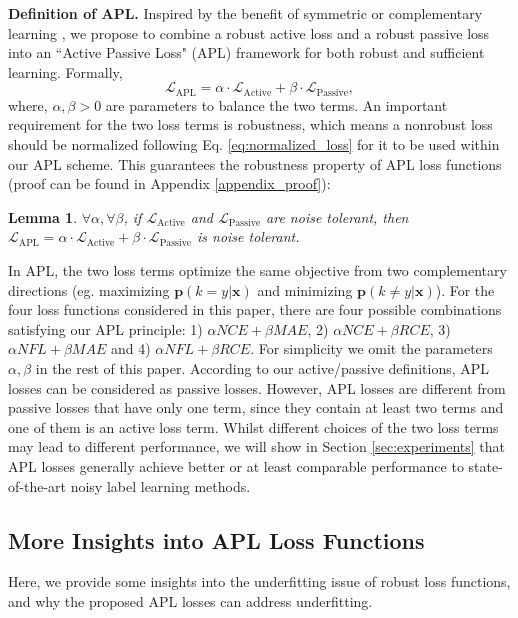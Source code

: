 \documentclass{article}
\newtheorem{lemma}{Lemma}
\def \xx {{\bm{x}}}
\def \pp {{\bm{p}}}
\def \L  {\mathcal{L}}
\begin{document}
\noindent\textbf{Definition of APL.} Inspired by the benefit of symmetric \cite{wang2019symmetric} or complementary learning \cite{kim2019nlnl}, we propose to combine a robust active loss and a robust passive loss into an ``Active Passive Loss" (APL) framework for both robust and sufficient learning. Formally,
\begin{equation}\label{eq:apl}
    \L_{\text{APL}} = \alpha \cdot \L_{\text{Active}} + \beta \cdot \L_{\text{Passive}},
\end{equation}
where, $\alpha, \beta > 0$ are parameters to balance the two terms.
An important requirement for the two loss terms is robustness, which means a nonrobust loss should be normalized following Eq. \eqref{eq:normalized_loss} for it to be used within our APL scheme. This guarantees the robustness property of APL loss functions (proof can be found in Appendix \ref{appendix_proof}):

\begin{lemma}\label{lemma_3}
$\forall \alpha, \forall \beta$, if $\L_{\text{Active}}$ and $\L_{\text{Passive}}$ are noise tolerant, then $\L_{\text{APL}} = \alpha \cdot \L_{\text{Active}} + \beta \cdot \L_{\text{Passive}}$ is noise tolerant.
\end{lemma}


In APL, the two loss terms optimize the same objective from two complementary directions (eg. maximizing $\pp(k=y|\xx)$ and minimizing $\pp(k \neq y|\xx)$). 
For the four loss functions considered in this paper, there are four possible combinations satisfying our APL principle: 1) $\alpha NCE+ \beta MAE$, 2) $\alpha NCE+\beta RCE$, 3) $\alpha NFL+ \beta MAE$ and 4) $\alpha NFL+ \beta RCE$. For simplicity we omit the parameters $\alpha, \beta$ in the rest of this paper. 
According to our active/passive definitions, APL losses can be considered as passive losses. However, APL losses are different from passive losses that have only one term, since they contain at least two terms and one of them is an active loss term.
Whilst different choices of the two loss terms may lead to different performance, we will show in Section \ref{sec:experiments} that APL losses generally achieve better or at least comparable performance to state-of-the-art noisy label learning methods.

\subsection{More Insights into APL Loss Functions}
Here, we provide some insights into the underfitting issue of robust loss functions, and why the proposed APL losses can address underfitting.
\end{document}
